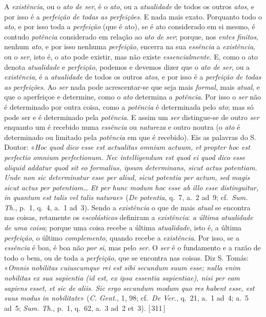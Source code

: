 \documentclass[12pt,a4paper]{article}
\newcommand{\pg}[1]{\thinspace\textup{[\,#1\,]}\thinspace}
\begin{document}
{  A \emph{existência}, ou o \emph{ato de ser}, é o \emph{ato}, ou a
  \emph{atualidade} de todos os outros \emph{atos}, e por isso é a
  \emph{perfeição de todas as perfeições}. E nada mais exato. Porquanto todo o
  \emph{ato}, e por isso toda a \emph{perfeição} (que é ato), se é ato
  considerado em si mesmo, é contudo \emph{potência} considerado em relação ao
  \emph{ato de ser}; porque, nos \emph{entes finitos}, nenhum \emph{ato}, e por
  isso nenhuma \emph{perfeição}, encerra na sua \emph{essência} a
  \emph{existência}, ou o \emph{ser}, isto é, o ato pode existir, mas não existe
  \emph{essencialmente}. E, como o ato denota \emph{atualidade} e
  \emph{perfeição}, podemos e devemos dizer que o \emph{ato de ser}, ou a
  \emph{existência}, é a \emph{atualidade} de todos os outros \emph{atos}, e por
  isso é a \emph{perfeição de todas as perfeições}. \textemdash{} Ao \emph{ser}
  nada pode acrescentar-se que seja mais \emph{formal}, mais \emph{atual}, e que
  o aperfeiçoe e determine, como o \emph{ato} determina a \emph{potência}. Por
  isso o \emph{ser} não é determinado por outra coisa, como a \emph{potência} é
  determinada pelo \emph{ato}; mas só pode ser e é determinado pela
  \emph{potência}. E assim um \emph{ser} distingue-se de outro \emph{ser}
  enquanto um é recebido numa \emph{essência} ou \emph{natureza} e outro
  noutra (o \emph{ato} é determinado ou limitado pela \emph{potência} em que é
  recebido). Eis as palavras do S. Doutor: «\textit{Hoc quod dico esse est
  actualitas omnium actuum, et propter hoc est perfectio omnium perfectionum.
  Nec intelligendum est quod ei quod dico esse aliquid addatur quod sit eo
  formalius, ipsum determinans, sicut actus potentiam. Unde non sic
  determinatur esse per aliud, sicut potentia per actum, sed magis sicut actus
  per potentiam\dots{} Et per hunc modum hoc esse ab illo esse distinguitur, in
  quantum est talis vel talis naturae}» (\emph{De potentia}, q.~7, a.~2 ad~9;
  cf.\ \emph{Sum. Th.}, p.~1, q.~4, a.~1 ad~3). \textemdash{} Sendo a
  \emph{existência} o que de mais \emph{atual} se encontra nas coisas, retamente
  os \emph{escolásticos} definiram a \emph{existência}: \emph{a última
  atualidade de uma coisa}; porque uma coisa recebe a última \emph{atualidade},
  isto é, a última \emph{perfeição}, o último \emph{complemento}, quando recebe
  a \emph{existência}. \textemdash{} Por isso, se a \emph{essência} é boa, é boa
  não \emph{por si}, mas pelo \emph{ser}. O \emph{ser} é o fundamento e a razão
  de todo o bem, ou de toda a \emph{perfeição}, que se encontra nas coisas. Diz
  S. Tomás: «\textit{Omnis nobilitas cuiuscumque rei est sibi secundum suum
  esse; nulla enim nobilitas ex sua sapientia (id est, ex ipsa essentia
  sapientiae), nisi per eam sapiens esset, et sic de aliis. Sic ergo secundum
  modum quo res habent esse, est suus modus in nobilitate}» (\emph{C. Gent.},
  1, 98; cf.\ \emph{De Ver.}, q.~21, a.~1 ad~4; a.~5 ad~5; \emph{Sum. Th.},
  p.~1, q.~62, a.~3 ad~2 et~3). \pg{311}

}
\end{document}
